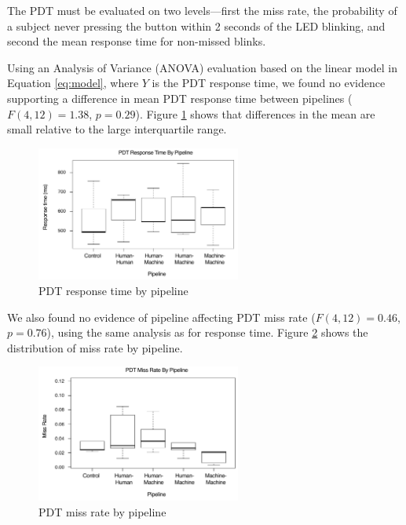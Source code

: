 The PDT must be evaluated on two levels---first the miss rate, the probability of a subject never pressing the button within 2 seconds of the LED blinking, and second the mean response time for non-missed blinks.

Using an Analysis of Variance (ANOVA) evaluation based on the linear model in Equation \ref{eq:model}, where $Y$ is the PDT response time, we found no evidence supporting a difference in mean PDT response time between pipelines ($F(4, 12) = 1.38$, $p=0.29$). Figure \ref{fig:plot:responsetime} shows that differences in the mean are small relative to the large interquartile range.

\begin{figure}[htbp]
  \centering
  \includegraphics[width=0.6\textwidth]{images/plot_responsetime.pdf}
  \caption{PDT response time by pipeline}
  \label{fig:plot:responsetime}
\end{figure}

We also found no evidence of pipeline affecting PDT miss rate ($F(4, 12) = 0.46$, $p=0.76$), using the same analysis as for response time. Figure \ref{fig:plot:missrate}  shows the distribution of miss rate by pipeline.

\begin{figure}[htbp]
  \centering
  \includegraphics[width=0.6\textwidth]{images/plot_misses.pdf}
  \caption{PDT miss rate by pipeline}
  \label{fig:plot:missrate}
\end{figure}

